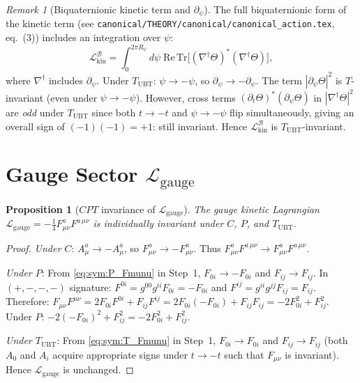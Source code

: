 \documentclass[12pt,a4paper]{article}
\newtheorem{proposition}[theorem]{Proposition}
\theoremstyle{definition}
\theoremstyle{remark}
\newtheorem{remark}[theorem]{Remark}
\begin{document}
\begin{remark}[Biquaternionic kinetic term and $\partial_\psi$]
\label{rem:act:kin_psi}
The full biquaternionic form of the kinetic term (see
\texttt{canonical/THEORY/canonical/canonical\_action.tex}, eq.~(3))
includes an integration over $\psi$:
\begin{equation}
  \mathcal{L}_{\mathrm{kin}}^{\mathcal{B}}
  = \int_0^{2\pi R_\psi} d\psi\;
    \mathrm{Re}\,\mathrm{Tr}\!\bigl[
    (\nabla^\dagger\Theta)^*(\nabla^\dagger\Theta)\bigr],
  \label{eq:act:kin_biquat}
\end{equation}
where $\nabla^\dagger$ includes $\partial_\psi$.
Under $T_{\mathrm{UBT}}$: $\psi \to -\psi$, so
$\partial_\psi \to -\partial_\psi$.
The term $|\partial_\psi\Theta|^2$ is $T$-invariant (even under $\psi\to-\psi$).
However, cross terms $(\partial_t\Theta)^*(\partial_\psi\Theta)$
in $|\nabla^\dagger\Theta|^2$ are \emph{odd} under $T_{\mathrm{UBT}}$
since both $t\to-t$ and $\psi\to-\psi$ flip simultaneously, giving
an overall sign of $(-1)(-1) = +1$: still invariant.
Hence $\mathcal{L}_{\mathrm{kin}}^{\mathcal{B}}$ is $T_{\mathrm{UBT}}$-invariant.
\end{remark}

\section{Gauge Sector $\mathcal{L}_{\mathrm{gauge}}$}
\label{sec:act:gauge}

\begin{proposition}[$CPT$ invariance of $\mathcal{L}_{\mathrm{gauge}}$]
\label{prop:act:gauge_CPT}
The gauge kinetic Lagrangian
$\mathcal{L}_{\mathrm{gauge}} = -\tfrac{1}{4}F_{\mu\nu}^a F^{a\,\mu\nu}$
is individually invariant under $C$, $P$, and $T_{\mathrm{UBT}}$.
\end{proposition}

\begin{proof}
\noindent\textit{Under $C$}: $A_\mu^a \to -A_\mu^a$, so $F_{\mu\nu}^a \to -F_{\mu\nu}^a$.
Thus $F_{\mu\nu}^a F^{a\,\mu\nu} \to F_{\mu\nu}^a F^{a\,\mu\nu}$. \checkmark

\noindent\textit{Under $P$}: 
From \eqref{eq:sym:P_Fmunu} in Step~1,
$F_{0i} \to -F_{0i}$ and $F_{ij} \to F_{ij}$.
In $(+,-,-,-)$ signature:
$F^{0i} = g^{00}g^{ii}F_{0i} = -F_{0i}$ and
$F^{ij} = g^{ii}g^{jj}F_{ij} = F_{ij}$.
Therefore:
$F_{\mu\nu}F^{\mu\nu}
= 2F_{0i}F^{0i} + F_{ij}F^{ij}
= 2F_{0i}(-F_{0i}) + F_{ij}F_{ij}
= -2F_{0i}^2 + F_{ij}^2$.
Under $P$: $-2(-F_{0i})^2 + F_{ij}^2 = -2F_{0i}^2 + F_{ij}^2$. \checkmark

\noindent\textit{Under $T_{\mathrm{UBT}}$}:
From \eqref{eq:sym:T_Fmunu} in Step~1, $F_{0i} \to F_{0i}$ and
$F_{ij} \to F_{ij}$ (both $A_0$ and $A_i$ acquire appropriate signs under
$t \to -t$ such that $F_{\mu\nu}$ is invariant).
Hence $\mathcal{L}_{\mathrm{gauge}}$ is unchanged. \checkmark
\end{proof}
\end{document}
